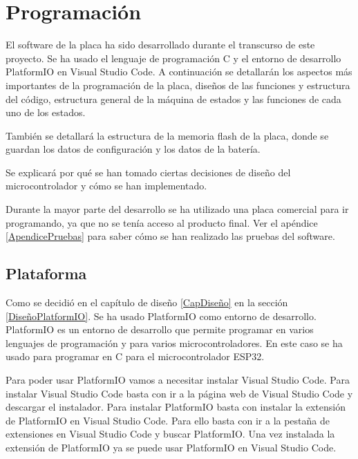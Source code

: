 \chapter{Programación}

El software de la placa ha sido desarrollado durante el transcurso de este proyecto. Se ha usado el lenguaje de programación C y el entorno de desarrollo \gls{PlatformIO} en Visual Studio Code. A continuación se detallarán los aspectos más importantes de la programación de la placa, diseños de las funciones y estructura del código, estructura general de la máquina de estados y las funciones de cada uno de los estados.

También se detallará la estructura de la memoria flash de la placa, donde se guardan los datos de configuración y los datos de la batería.

Se explicará por qué se han tomado ciertas decisiones de diseño del microcontrolador y cómo se han implementado.

\begin{tcolorbox}[colback=blue!5!white, colframe=blue!55!white, title=Nota]
    Durante la mayor parte del desarrollo se ha utilizado una placa comercial para ir programando, ya que no se tenía acceso al producto final. Ver el apéndice \ref{ApendicePruebas} para saber cómo se han realizado las pruebas del software.  
\end{tcolorbox}

\section{Plataforma}
Como se decidió en el capítulo de diseño \ref{CapDiseño} en la sección \ref{DiseñoPlatformIO}. Se ha usado \gls{PlatformIO} como entorno de desarrollo. \gls{PlatformIO} es un entorno de desarrollo que permite programar en varios lenguajes de programación y para varios microcontroladores. En este caso se ha usado para programar en C para el microcontrolador ESP32.

Para poder usar \gls{PlatformIO} vamos a necesitar instalar Visual Studio Code. Para instalar Visual Studio Code basta con ir a la página web de Visual Studio Code y descargar el instalador. Para instalar \gls{PlatformIO} basta con instalar la extensión de \gls{PlatformIO} en Visual Studio Code. Para ello basta con ir a la pestaña de extensiones en Visual Studio Code y buscar \gls{PlatformIO}. Una vez instalada la extensión de \gls{PlatformIO} ya se puede usar \gls{PlatformIO} en Visual Studio Code.

